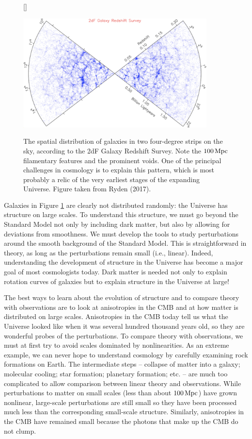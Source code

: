 \documentclass[a4paper,11pt]{article}
\begin{document}
\begin{figure}[h]
    [\FBwidth]
    {\caption{\footnotesize{The spatial distribution of galaxies in two four-degree strips on the sky, according to the 2dF Galaxy Redshift Survey. Note the $100\,{\rm Mpc}$ filamentary features and the prominent voids. One of the principal challenges in cosmology is to explain this pattern, which is most probably a relic of the very earliest stages of the expanding Universe. Figure taken from Ryden (2017).}}
    \label{fig:2df}}
    {\includegraphics[width=10cm]{figures/2df.png}}
\end{figure}

{\noindent}Galaxies in Figure \ref{fig:2df} are clearly not distributed randomly: the Universe has structure on large scales. To understand this structure, we must go beyond the Standard Model not only by including dark matter, but also by allowing for deviations from smoothness. We must develop the tools to study perturbations around the smooth background of the Standard Model. This is straightforward in theory, as long as the perturbations remain small (i.e., linear). Indeed, understanding the development of structure in the Universe has become a major goal of most cosmologists today. Dark matter is needed not only to explain rotation curves of galaxies but to explain structure in the Universe at large!

{\noindent}The best ways to learn about the evolution of structure and to compare theory with observations are to look at anisotropies in the CMB and at how matter is distributed on large scales. Anisotropies in the CMB today tell us what the Universe looked like when it was several hundred thousand years old, so they are wonderful probes of the perturbations. To compare theory with observations, we must at first try to avoid scales dominated by nonlinearities. As an extreme example, we can never hope to understand cosmology by carefully examining rock formations on Earth. The intermediate steps -- collapse of matter into a galaxy; molecular cooling; star formation; planetary formation; etc. -- are much too complicated to allow comparison between linear theory and observations. While perturbations to matter on small scales (less than about $100\,{\rm Mpc}$) have grown nonlinear, large-scale perturbations are still small so they have been processed much less than the corresponding small-scale structure. Similarly, anisotropies in the CMB have remained small because the photons that make up the CMB do not clump.
\end{document}
